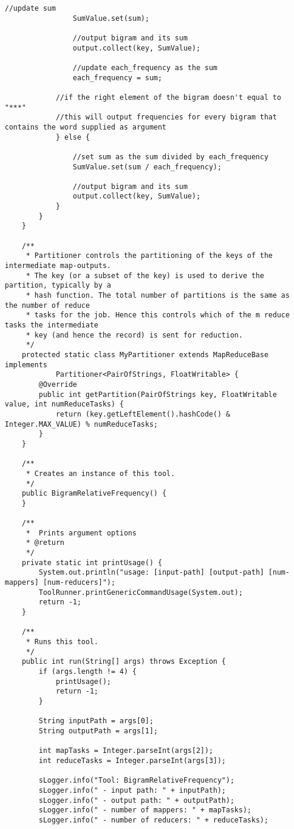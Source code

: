 \documentclass{article} %
\begin{document}
\begin{lstlisting}[style=Java]
				//update sum
				SumValue.set(sum);
				
				//output bigram and its sum
				output.collect(key, SumValue);
				
				//update each_frequency as the sum 
				each_frequency = sum;
			
			//if the right element of the bigram doesn't equal to "***"
			//this will output frequencies for every bigram that contains the word supplied as argument
			} else {
				
				//set sum as the sum divided by each_frequency
				SumValue.set(sum / each_frequency);
				
				//output bigram and its sum
				output.collect(key, SumValue);
			}
		}
	}
	
	/**
	 * Partitioner controls the partitioning of the keys of the intermediate map-outputs.
	 * The key (or a subset of the key) is used to derive the partition, typically by a
	 * hash function. The total number of partitions is the same as the number of reduce
	 * tasks for the job. Hence this controls which of the m reduce tasks the intermediate
	 * key (and hence the record) is sent for reduction.
	 */
	protected static class MyPartitioner extends MapReduceBase implements
			Partitioner<PairOfStrings, FloatWritable> {
		@Override
		public int getPartition(PairOfStrings key, FloatWritable value, int numReduceTasks) {
			return (key.getLeftElement().hashCode() & Integer.MAX_VALUE) % numReduceTasks;
		}
	}

	/**
	 * Creates an instance of this tool.
	 */
	public BigramRelativeFrequency() {
	}

	/**
	 *  Prints argument options
	 * @return
	 */
	private static int printUsage() {
		System.out.println("usage: [input-path] [output-path] [num-mappers] [num-reducers]");
		ToolRunner.printGenericCommandUsage(System.out);
		return -1;
	}

	/**
	 * Runs this tool.
	 */
	public int run(String[] args) throws Exception {
		if (args.length != 4) {
			printUsage();
			return -1;
		}

		String inputPath = args[0];
		String outputPath = args[1];

		int mapTasks = Integer.parseInt(args[2]);
		int reduceTasks = Integer.parseInt(args[3]);

		sLogger.info("Tool: BigramRelativeFrequency");
		sLogger.info(" - input path: " + inputPath);
		sLogger.info(" - output path: " + outputPath);
		sLogger.info(" - number of mappers: " + mapTasks);
		sLogger.info(" - number of reducers: " + reduceTasks);


\end{lstlisting}
\end{document}
